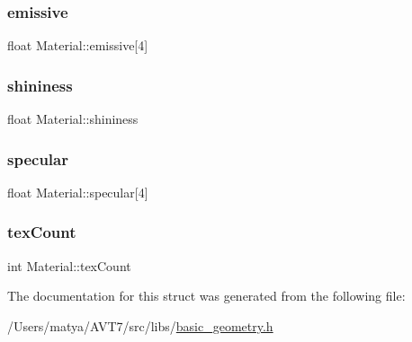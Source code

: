 \mbox{\label{struct_material_a374ee687979c26f4a9e3d671d89a9751}} 
\subsubsection{\texorpdfstring{emissive}{emissive}}
{\footnotesize\ttfamily float Material\+::emissive\mbox{[}4\mbox{]}}

\mbox{\label{struct_material_a9dc184c883ec135ace28c1917af3fe84}} 
\subsubsection{\texorpdfstring{shininess}{shininess}}
{\footnotesize\ttfamily float Material\+::shininess}

\mbox{\label{struct_material_a570719a080c2168e8c0225c085472c64}} 
\subsubsection{\texorpdfstring{specular}{specular}}
{\footnotesize\ttfamily float Material\+::specular\mbox{[}4\mbox{]}}

\mbox{\label{struct_material_ad0964c5d437284a4dc9cfbe6e6dcafcc}} 
\subsubsection{\texorpdfstring{tex\+Count}{texCount}}
{\footnotesize\ttfamily int Material\+::tex\+Count}



The documentation for this struct was generated from the following file\+:\begin{DoxyCompactItemize}
\item 
/\+Users/matya/\+A\+V\+T7/src/libs/\hyperlink{basic__geometry_8h}{basic\+\_\+geometry.\+h}\end{DoxyCompactItemize}

